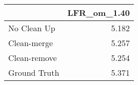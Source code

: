 \begin{tabular}{lr}
\toprule
{} & LFR_om_1.40 \\
\midrule
No Clean Up  &       5.182 \\
Clean-merge  &       5.257 \\
Clean-remove &       5.254 \\
Ground Truth &       5.371 \\
\bottomrule
\end{tabular}
